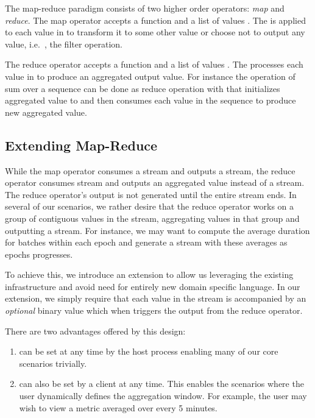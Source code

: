 \documentclass[sigchi]{acmart}
\begin{document}
The map-reduce paradigm consists of two higher order operators: \emph{map} and \emph{reduce}. The map operator accepts a function  and a list of values . The  is applied to each value in  to transform it to some other value or choose not to output any value, i.e.\ , the filter operation.

The reduce operator accepts a function  and a list of values . The  processes each value in  to produce an aggregated output value. For instance the operation of sum over a sequence can be done as reduce operation with  that initializes aggregated value to  and then consumes each value in the sequence to produce new aggregated value.





\subsection{Extending Map-Reduce}\label{map-reduce-ext}
While the map operator consumes a stream and outputs a stream, the reduce operator consumes stream and outputs an aggregated value instead of a stream. The reduce operator's output is not generated until the entire stream ends. In several of our scenarios, we rather desire that the reduce operator works on a group of contiguous values in the stream, aggregating values in that group and outputting a stream. For instance, we may want to compute the average duration for batches within each epoch and generate a stream with these averages as epochs progresses.

To achieve this, we introduce an extension to allow us leveraging the existing infrastructure and avoid need for entirely new domain specific language. In our extension, we simply require that each value in the stream is accompanied by an \emph{optional} binary value  which when  triggers the output from the reduce operator.

There are two advantages offered by this design:

\begin{enumerate}
  \item  can be set at any time by the host process  enabling many of our core scenarios trivially.
\item  can also be set by a client at any time. This enables the scenarios where the user dynamically defines the aggregation window. For example, the user may wish to view a metric averaged over every 5 minutes.
\end{enumerate}
\end{document}

